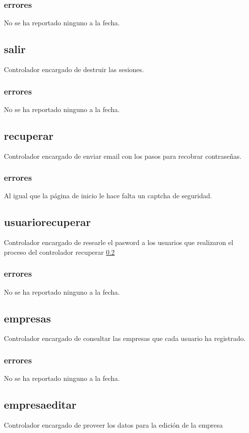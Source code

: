 \documentclass[10pt,a4paper]{book}
\begin{document}
	\subsubsection{errores}
	No se ha reportado ninguno a la fecha.

	\subsection{salir}
	Controlador encargado de destruir las sesiones.
	\subsubsection{errores}
	No se ha reportado ninguno a la fecha.

	\subsection{recuperar}\label{recuperar}
	Controlador encargado de enviar email con los pasos para recobrar contraseñas.
	\subsubsection{errores}
	Al igual que la página de inicio le hace falta un captcha de seguridad.

	\subsection{usuariorecuperar}
	Controlador encargado de researle el pasword a los usuarios que realizaron el proceso del controlador  recuperar \ref{recuperar}
	\subsubsection{errores}
	No se ha reportado ninguno a la fecha.

	\subsection{empresas}
	Controlador encargado de consultar las empresas que cada usuario ha registrado.
	\subsubsection{errores}
	No se ha reportado ninguno a la fecha.

	\subsection{empresaeditar}
	Controlador encargado de proveer los datos para la edición de la empresa
\end{document}
